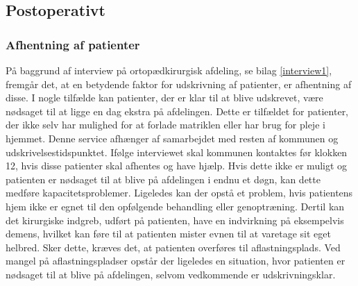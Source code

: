 \subsection{Postoperativt}

\subsubsection{Afhentning af patienter}
På baggrund af interview på ortopædkirurgisk afdeling, se bilag \ref{interview1}, fremgår det, at en betydende faktor for udskrivning af patienter, er afhentning af disse. I nogle tilfælde kan patienter, der er klar til at blive udskrevet, være nødsaget til at ligge en dag ekstra på afdelingen. Dette er tilfældet for patienter, der ikke selv har mulighed for at forlade matriklen eller har brug for pleje i hjemmet. Denne service afhænger af samarbejdet med resten af kommunen og udskrivelsestidspunktet. Ifølge interviewet skal kommunen kontaktes før klokken 12, hvis disse patienter skal afhentes og have hjælp. Hvis dette ikke er muligt og patienten er nødsaget til at blive på afdelingen i endnu et døgn, kan dette medføre kapacitetsproblemer. 
Ligeledes kan der opstå et problem, hvis patientens hjem ikke er egnet til den opfølgende behandling eller genoptræning. Dertil kan det kirurgiske indgreb, udført på patienten, have en indvirkning på eksempelvis demens, hvilket kan føre til at patienten mister evnen til at varetage sit eget helbred. Sker dette, kræves det, at patienten overføres til aflastningsplads. Ved mangel på aflastningspladser opstår der ligeledes en situation, hvor patienten er nødsaget til at blive på afdelingen, selvom vedkommende er udskrivningsklar. 


